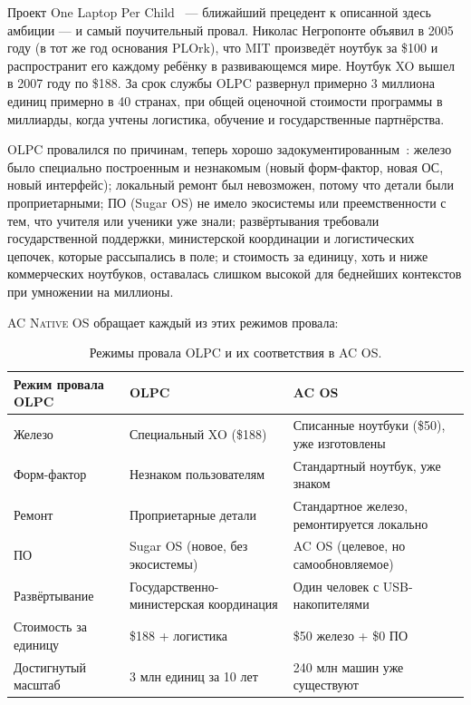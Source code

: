 \documentclass[10pt,letterpaper,twocolumn]{article}
\newcommand{\acos}{\textsc{AC Native OS}}
\begin{document}
Проект One Laptop Per Child~\citep{negroponte1995being, kraemer2009olpc} --- ближайший прецедент к описанной здесь амбиции --- и самый поучительный провал. Николас Негропонте объявил в 2005 году (в тот же год основания PLOrk), что MIT произведёт ноутбук за \$100 и распространит его каждому ребёнку в развивающемся мире. Ноутбук XO вышел в 2007 году по \$188. За срок службы OLPC развернул примерно 3 миллиона единиц примерно в 40 странах, при общей оценочной стоимости программы в миллиарды, когда учтены логистика, обучение и государственные партнёрства.

OLPC провалился по причинам, теперь хорошо задокументированным~\citep{kraemer2009olpc}: железо было специально построенным и незнакомым (новый форм-фактор, новая ОС, новый интерфейс); локальный ремонт был невозможен, потому что детали были проприетарными; ПО (Sugar OS) не имело экосистемы или преемственности с тем, что учителя или ученики уже знали; развёртывания требовали государственной поддержки, министерской координации и логистических цепочек, которые рассыпались в поле; и стоимость за единицу, хоть и ниже коммерческих ноутбуков, оставалась слишком высокой для беднейших контекстов при умножении на миллионы.

\acos{} обращает каждый из этих режимов провала:

\begin{table}[h]
\small
\centering
\begin{tabularx}{\columnwidth}{lXX}
\toprule
\textbf{Режим провала OLPC} & \textbf{OLPC} & \textbf{AC OS} \\
\midrule
Железо & Специальный XO (\$188) & Списанные ноутбуки (\$50), уже изготовлены \\
Форм-фактор & Незнаком пользователям & Стандартный ноутбук, уже знаком \\
Ремонт & Проприетарные детали & Стандартное железо, ремонтируется локально \\
ПО & Sugar OS (новое, без экосистемы) & AC OS (целевое, но самообновляемое) \\
Развёртывание & Государственно-министерская координация & Один человек с USB-накопителями \\
Стоимость за единицу & \$188 + логистика & \$50 железо + \$0 ПО \\
Достигнутый масштаб & 3 млн единиц за 10 лет & 240 млн машин уже существуют \\
\bottomrule
\end{tabularx}
\caption{Режимы провала OLPC и их соответствия в AC OS.}
\label{tab:olpc}
\end{table}
\end{document}
